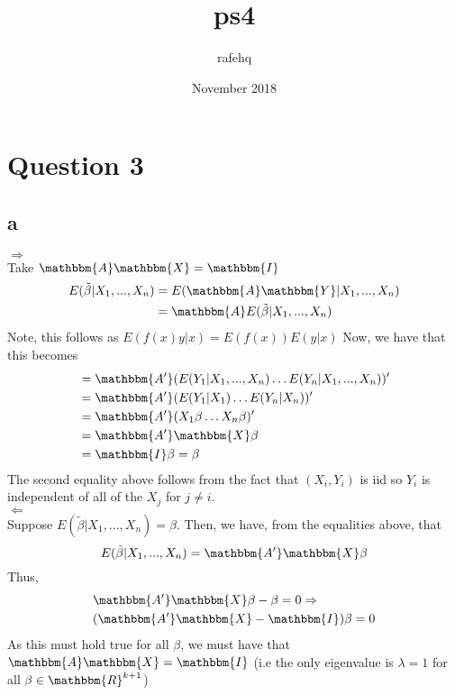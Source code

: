 \documentclass{article}
\title{ps4}
\author{rafehq }
\date{November 2018}
\begin{document}
\maketitle

\section*{Question 3}
\subsection*{a}
$\Rightarrow$ \\
Take $\mathbbm{A}\mathbbm{X} = \mathbbm{I}$
\begin{align}
    E(\tilde \beta | X_1,...,X_n) & = E(\mathbbm{A} \mathbbm{Y}|X_1,...,X_n ) \\
&=  \mathbbm{A} E(\tilde \beta | X_1,...,X_n)
\end{align}
Note, this follows as $E(f(x)y|x) = E(f(x))E(y|x)$
Now, we have that this becomes
\begin{align*}
 & = \mathbbm{A'}(E(Y_1|X_1,...,X_n) \dots E(Y_n|X_1,...,X_n))' \\
&=  \mathbbm{A'}(E(Y_1|X_1) \dots E(Y_n|X_n))' \\
&=  \mathbbm{A'}(X_1\beta \dots X_n\beta)' \\
&=  \mathbbm{A'}\mathbbm{X}\beta \\
&=  \mathbbm{I}\beta = \beta \\
\end{align*}
The second equality above follows from the fact that $(X_i,Y_i)$ is iid so $Y_i$ is independent of all of the $X_j$ for $j \neq i$. \\
$\Leftarrow$ \\
Suppose $ E(\tilde \beta | X_1,...,X_n) = \beta$. Then, we have, from the equalities above, that  
$$E(\tilde \beta | X_1,...,X_n) =  \mathbbm{A'}\mathbbm{X}\beta $$
Thus,
\begin{align*}
     & \mathbbm{A'}\mathbbm{X}\beta - \beta = 0  \Rightarrow \\
    & (\mathbbm{A'}\mathbbm{X} - \mathbbm{I})\beta = 0
\end{align*}  
As this must hold true for all $\beta$, we must have that $\mathbbm{A}\mathbbm{X} = \mathbbm{I}$ (i.e the only eigenvalue is $\lambda = 1$ for all $\beta \in \mathbbm{R}^{k+1}$)
\end{document}
